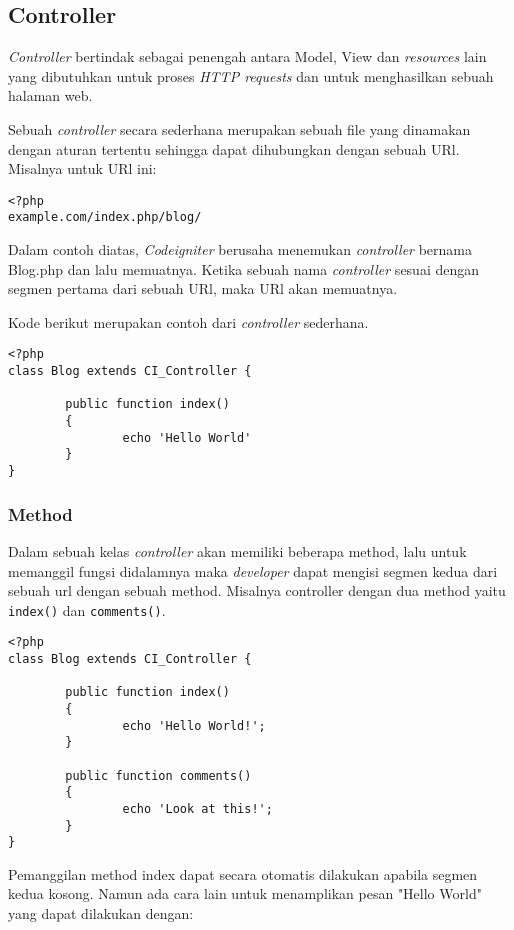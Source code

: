 \subsection{Controller}
\textit{Controller} bertindak sebagai penengah antara Model, View dan \textit{resources} lain yang dibutuhkan untuk proses \textit{HTTP requests} dan untuk menghasilkan sebuah halaman web.

Sebuah \textit{controller} secara sederhana merupakan sebuah file yang dinamakan dengan aturan tertentu sehingga dapat dihubungkan dengan sebuah URl.
Misalnya untuk URl ini:
\begin{lstlisting}[frame=single] 
<?php
example.com/index.php/blog/
\end{lstlisting}

Dalam contoh diatas, \textit{Codeigniter} berusaha menemukan \textit{controller} bernama Blog.php dan lalu memuatnya. Ketika sebuah nama \textit{controller} sesuai dengan segmen pertama dari sebuah URl, maka URl akan memuatnya.

Kode berikut merupakan contoh dari \textit{controller} sederhana.
\begin{lstlisting}[frame=single] 
<?php
class Blog extends CI_Controller {

        public function index()
        {
                echo 'Hello World'
        }
}
\end{lstlisting} 

\subsubsection{Method}
Dalam sebuah kelas \textit{controller} akan memiliki beberapa method, lalu untuk memanggil fungsi didalamnya maka \textit{developer} dapat mengisi segmen kedua dari sebuah url dengan sebuah method. Misalnya controller dengan dua method yaitu \texttt{index()} dan \texttt{comments()}.
\begin{lstlisting}[frame=single] 
<?php
class Blog extends CI_Controller {

        public function index()
        {
                echo 'Hello World!';
        }

        public function comments()
        {
                echo 'Look at this!';
        }
}
\end{lstlisting}

\noindent Pemanggilan method index dapat secara otomatis dilakukan apabila segmen kedua kosong. Namun ada cara lain untuk menamplikan pesan "Hello World" yang dapat dilakukan dengan:

